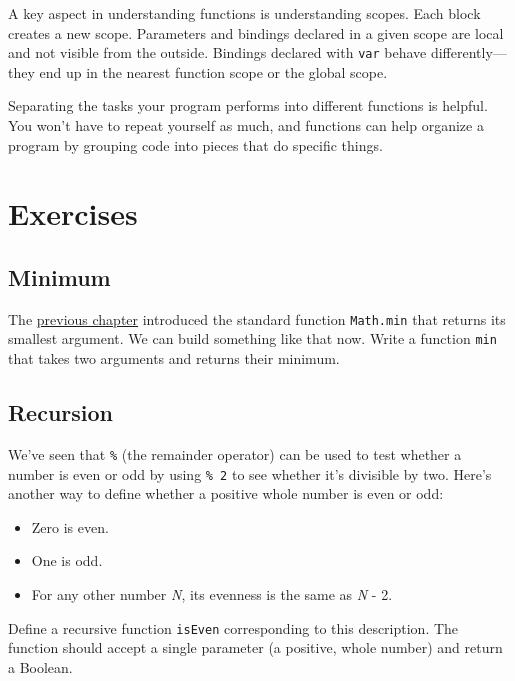 A key aspect in understanding functions is understanding scopes. Each block creates a new scope. Parameters and bindings declared in a given scope are local and not visible from the outside. Bindings declared with \lstinline`var` behave differently—they end up in the nearest function scope or the global scope.

Separating the tasks your program performs into different functions is helpful. You won't have to repeat yourself as much, and functions can help organize a program by grouping code into pieces that do specific things.

\section{Exercises}

\subsection{Minimum}

The \hyperref[program_structure.return_values]{previous chapter} introduced the standard function \lstinline`Math.min` that returns its smallest argument. We can build something like that now. Write a function \lstinline`min` that takes two arguments and returns their minimum.

\subsection{Recursion}

We've seen that \lstinline`%` (the remainder operator) can be used to test whether a number is even or odd by using \lstinline`% 2` to see whether it's divisible by two. Here's another way to define whether a positive whole number is even or odd:

\begin{itemize}
\item 

Zero is even.
\item 

One is odd.
\item 

For any other number \emph{N}, its evenness is the same as \emph{N} - 2.
\end{itemize}

Define a recursive function \lstinline`isEven` corresponding to this description. The function should accept a single parameter (a positive, whole number) and return a Boolean.

